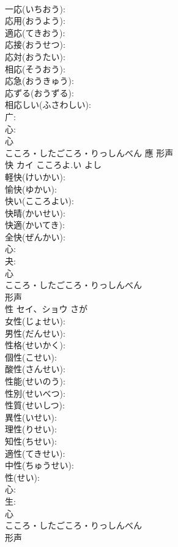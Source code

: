 \documentclass[8pt]{extreport}
\begin{document}
\begin{CJK}{UTF8}{min}
\\	一応(いちおう): 
\\	応用(おうよう): 
\\	適応(てきおう): 
\\	応接(おうせつ): 
\\	応対(おうたい): 
\\	相応(そうおう): 
\\	応急(おうきゅう): 
\\	応ずる(おうずる): 
\\	相応しい(ふさわしい): 
\\	广: 
\\	心: 
\\	心	
\\	こころ・したごころ・りっしんべん	應	形声 
\\	快	カイ	こころよ.い	よし	
\\	軽快(けいかい): 
\\	愉快(ゆかい): 
\\	快い(こころよい): 
\\	快晴(かいせい): 
\\	快適(かいてき): 
\\	全快(ぜんかい): 
\\	心: 
\\	夬: 
\\	心	
\\	こころ・したごころ・りっしんべん	
\\	形声 
\\	性	セイ、ショウ	さが		
\\	女性(じょせい): 
\\	男性(だんせい): 
\\	性格(せいかく): 
\\	個性(こせい): 
\\	酸性(さんせい): 
\\	性能(せいのう): 
\\	性別(せいべつ): 
\\	性質(せいしつ): 
\\	異性(いせい): 
\\	理性(りせい): 
\\	知性(ちせい): 
\\	適性(てきせい): 
\\	中性(ちゅうせい): 
\\	性(せい): 
\\	心: 
\\	生: 
\\	心	
\\	こころ・したごころ・りっしんべん	
\\	形声 

\end{CJK}
\end{document}
